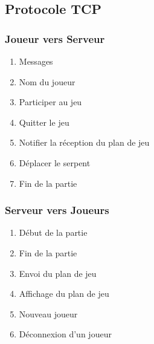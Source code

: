 \documentclass{report}
\begin{document}
		\subsection{Protocole TCP}
			\subsubsection{Joueur vers Serveur}
				\begin{enumerate}
					\item Messages
					 \label{messages}
					\item Nom du joueur
					 \label{nomJoueur}
					\item Participer au jeu
					 \label{participerJeu}
					\item Quitter le jeu
					 \label{quitterJeu}
					\item Notifier la réception du plan de jeu
					 \label{receptionPlanJeu}
					\newpage
					\item Déplacer le serpent
					 \label{deplacerSerpent}
					\item Fin de la partie
					 \label{finPartie}
					
				\end{enumerate}				

			\subsubsection{Serveur vers Joueurs}
				 \label{serveurJoueur}
				
				\begin{enumerate}
					\item Début de la partie
					 \label{debutPartie}
					\item Fin de la partie
					 \label{finPartie}
					\item Envoi du plan de jeu
					 \label{envoiPlan}
					\item Affichage du plan de jeu
					 \label{affichePlan}
					\newpage
					\item Nouveau joueur
					 \label{nouveauJoueur}
					\item Déconnexion d'un joueur
					 \label{joueurParti}
					
				\end{enumerate}			
\end{document}
